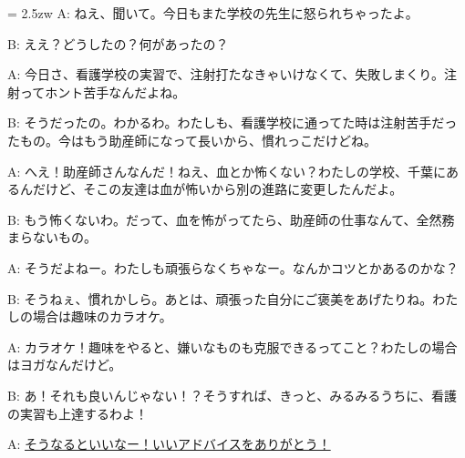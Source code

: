 \documentclass[11pt]{amsart}
\title{}
\author{}
\newenvironment{hangall}[1]{\hangindent = 2.5zw\everypar{\hangindent = 2.5zw}}{}
\begin{document}
\maketitle
\begin{hangall}{}%
A: ねえ、聞いて。今日もまた学校の先生に怒られちゃったよ。

B: ええ？どうしたの？何があったの？

A: 今日さ、看護学校の実習で、注射打たなきゃいけなくて、失敗しまくり。注射ってホント苦手なんだよね。

B: そうだったの。わかるわ。わたしも、看護学校に通ってた時は注射苦手だったもの。今はもう助産師になって長いから、慣れっこだけどね。

A: へえ！助産師さんなんだ！ねえ、血とか怖くない？わたしの学校、千葉にあるんだけど、そこの友達は血が怖いから別の進路に変更したんだよ。

B: もう怖くないわ。だって、血を怖がってたら、助産師の仕事なんて、全然務まらないもの。

A: そうだよねー。わたしも頑張らなくちゃなー。なんかコツとかあるのかな？

B: そうねぇ、慣れかしら。あとは、頑張った自分にご褒美をあげたりね。わたしの場合は趣味のカラオケ。

A: カラオケ！趣味をやると、嫌いなものも克服できるってこと？わたしの場合はヨガなんだけど。

B: あ！それも良いんじゃない！？そうすれば、きっと、みるみるうちに、看護の実習も上達するわよ！

A: \ul{そうなるといいなー！いいアドバイスをありがとう！}\end{hangall}
\end{document}
